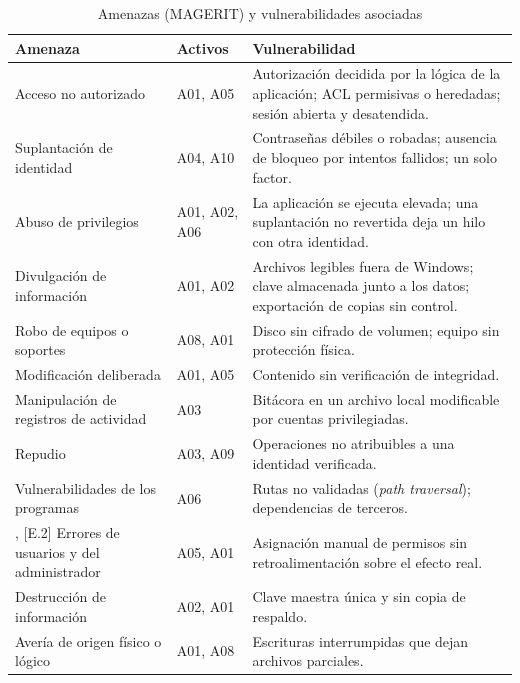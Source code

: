 \documentclass[conference]{IEEEtran}
\begin{document}
\begin{table}[!htb]
\caption{Amenazas (MAGERIT) y vulnerabilidades asociadas}
\label{tab:amenazas}
\centering
\footnotesize
\setlength{\tabcolsep}{3pt}
\begin{tabular}{|p{2.5cm}|p{1.0cm}|p{4.2cm}|}
\hline
\textbf{Amenaza} & \textbf{Activos} & \textbf{Vulnerabilidad} \\
\hline
[A.11] Acceso no autorizado & A01, A05 & Autorización decidida por la lógica de la aplicación; ACL permisivas o heredadas; sesión abierta y desatendida. \\
\hline
[A.5] Suplantación de identidad & A04, A10 & Contraseñas débiles o robadas; ausencia de bloqueo por intentos fallidos; un solo factor. \\
\hline
[A.6] Abuso de privilegios & A01, A02, A06 & La aplicación se ejecuta elevada; una suplantación no revertida deja un hilo con otra identidad. \\
\hline
[A.19] Divulgación de información & A01, A02 & Archivos legibles fuera de Windows; clave almacenada junto a los datos; exportación de copias sin control. \\
\hline
[A.25] Robo de equipos o soportes & A08, A01 & Disco sin cifrado de volumen; equipo sin protección física. \\
\hline
[A.15] Modificación deliberada & A01, A05 & Contenido sin verificación de integridad. \\
\hline
[A.3] Manipulación de registros de actividad & A03 & Bitácora en un archivo local modificable por cuentas privilegiadas. \\
\hline
[A.13] Repudio & A03, A09 & Operaciones no atribuibles a una identidad verificada. \\
\hline
[E.20] Vulnerabilidades de los programas & A06 & Rutas no validadas (\textit{path traversal}); dependencias de terceros. \\
\hline
[E.1], [E.2] Errores de usuarios y del administrador & A05, A01 & Asignación manual de permisos sin retroalimentación sobre el efecto real. \\
\hline
[E.18] Destrucción de información & A02, A01 & Clave maestra única y sin copia de respaldo. \\
\hline
[I.5] Avería de origen físico o lógico & A01, A08 & Escrituras interrumpidas que dejan archivos parciales. \\
\hline
\end{tabular}
\end{table}
\end{document}
